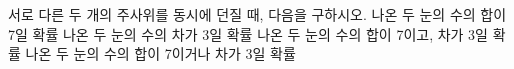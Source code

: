 서로 다른 두 개의 주사위를 동시에 던질 때, 다음을 구하시오.
 나온 두 눈의 수의 합이 7일 확률
 나온 두 눈의 수의 차가 3일 확률
 나온 두 눈의 수의 합이 7이고, 차가 3일 확률
 나온 두 눈의 수의 합이 7이거나 차가 3일 확률
